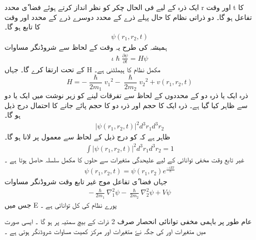 
ایک ذرہ کے لیے فی الحال چکر کو نظر انداز کرتے ہوئے      فضا ٗی محدد r اور وقت t کا تفاعل ہو گا۔ دو ذراتی نظام کا حال پہلے ذرے کے محدد   دوسرے ذرے کے محدد   اور وقت کا تابع ہو گا۔ 
\begin{align}   
\psi ( r_1 , r_2 , t ) 
\end{align}
 ہمیشہ کی طرح یہ وقت کے لحاظ سے شروڈنگر مساوات 
\begin{align}
\iota \hslash \frac{ \partial \psi }{ \partial t } = H \psi
\end{align}
کے تحت ارتقا کرے گا۔ جہاں H مکمل  نظام کا ہیملٹنی  ہے۔
\begin{equation}
H = - \frac{ \hslash }{ 2 m_1 } {v_1}^2  -  \frac{ \hslash }{ 2 m_2 } { v_2 }^2 +  v( r_1 , r_2 , t )
\end{equation}
ذرہ ایک یا ذرہ دو کے محددوں کے لحاظ سے  تفرقات لینے کو   زیر نوشت میں ایک یا دو سے ظاہر کیا گیا ہے۔ ذرہ ایک کا حجم   اور ذرہ دو کا حجم  پائے جانے کا احتمال درج ذیل ہو گا۔ 
\begin{align}
| \psi ( r_1 , r_2 , t ) |^2 { d^3 } { r_1 }  { d^3 } { r_2 }
\end{align}
ظاہر ہے کہ   کو درج ذیل کے لحاظ سے معمول پر لانا ہو گا۔ 
\begin{align}
\int | \psi ( r_1 , r_2 , t ) |^2 { d^3 } { r_1 } { d^3 } { r_2 } = 1
\end{align}
غیر تابع وقت مخفی توانائی کے لیے علیحدگی  متغیرات  سے حلوں کا مکمل سلسلہ حاصل ہوتا ہے ۔ 
\begin{align}
\psi ( r_1 , r_2 , t ) =  \psi ( r_1 , r_2 ) {e}^\frac{ - i E t }{h}  
\end{align}
جہاں فضا ٗی تفاعل موج   غیر تابع وقت شروڈنگر مساوات 
\begin{align}
-\frac{ \hslash }{ 2 m_1 }  {\nabla_1^2} { \psi } - \frac{ \hslash }{ 2 m_2 } \nabla_2^2 { \psi } + V \psi 
\end{align}
جس میں E پورے نظام کی کل توانائی ہے ۔ 

عام طور پر  باہمی مخفی توانائی انحصار صرف 2 ذرات کے بیچ سمتیہ  پر ہو گا ۔ ایسی صورت میں متغیرات   اور   کی جگہ نےٗ متغیرات  اور مرکز کمیت  مساوات شروڈنگر ہوتی ہے ۔  

